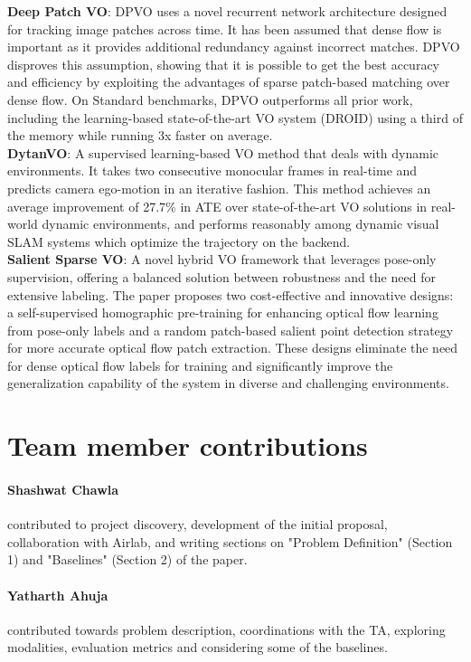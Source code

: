 \documentclass[11pt,a4paper]{article}
\begin{document}
\textbf{Deep Patch VO}:  DPVO uses a novel recurrent network architecture designed for tracking image patches across time. It has been assumed that dense flow is important as it provides additional redundancy against incorrect matches. DPVO disproves this assumption, showing that it is possible to get the best accuracy and efficiency by exploiting the advantages of sparse patch-based matching over dense flow. On Standard benchmarks, DPVO outperforms all prior work, including the learning-based state-of-the-art VO system (DROID) using a third of the memory while running 3x faster on average. \cite{deepVO} \\

\textbf{DytanVO}: A supervised learning-based VO method that deals with dynamic environments. It takes two consecutive monocular frames in real-time and predicts camera ego-motion in an iterative fashion. This method achieves an average improvement of 27.7\% in ATE over state-of-the-art VO solutions in real-world dynamic environments, and performs reasonably among dynamic visual SLAM systems which optimize the trajectory on the backend. \cite{dytanvo}\\

\textbf{Salient Sparse VO}: A novel hybrid VO framework that leverages pose-only supervision, offering a balanced solution between robustness and the need for extensive labeling. The paper proposes two cost-effective and innovative designs: a self-supervised homographic pre-training for enhancing optical flow learning from pose-only labels and a random patch-based salient point detection strategy for more accurate optical flow patch extraction. These designs eliminate the need for dense optical flow labels for training and significantly improve the generalization capability of the system in diverse and challenging environments.
\cite{SuperSparse}

\section{Team member contributions}
\paragraph{Shashwat Chawla} contributed to project discovery, development of the initial proposal, collaboration with Airlab, and writing sections on "Problem Definition" (Section 1) and "Baselines" (Section 2) of the paper.

\paragraph{Yatharth Ahuja} contributed towards problem description, coordinations with the TA, exploring modalities, evaluation metrics and considering some of the baselines.
\end{document}
